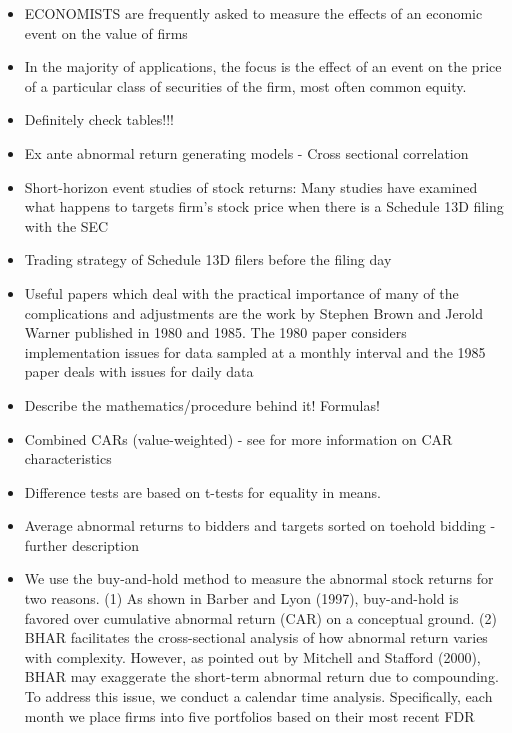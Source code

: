 \documentclass[12pt]{article}
\begin{document}
    \begin{itemize}
        
        \item ECONOMISTS are frequently asked to measure the effects of an economic event on the value of firms \citep{MacKinlay1997}

        \item In the majority of applications, the focus is the effect of an event on the price of a particular class of securities of the firm, most often common equity. \citep{MacKinlay1997}

        \item Definitely check \citet{Betton2009} tables!!!
        
        \item Ex ante abnormal return generating models \citep{Kolari2010} - Cross sectional correlation 

        \item Short-horizon event studies of stock returns: Many studies have examined what happens to targets firm’s stock price when there is a Schedule 13D filing with the SEC \citep{CoffeeJr.2014}

        \item Trading strategy of Schedule 13D filers before the filing day \citep{Collin-Dufresne2015}
        
        \item Useful papers which deal with the practical importance of many of the complications and adjustments are the work by Stephen Brown and Jerold Warner published in 1980 and 1985. The 1980 paper considers implementation issues for data sampled at a monthly interval and the 1985 paper deals with issues for daily data \citep{MacKinlay1997}
        
        \item Describe the mathematics/procedure behind it! Formulas! 

        \item Combined CARs (value-weighted) - see \citet{Mitchell2011} for more information on CAR characteristics

        \item Difference tests are based on t-tests for equality in means. \citep{Moeller2004}

        \item Average abnormal returns to bidders and targets sorted on toehold bidding - further description \citep{Betton2009}

        \item We use the buy-and-hold method to measure the abnormal stock returns for two reasons. (1) As shown in Barber and Lyon (1997), buy-and-hold is favored over cumulative abnormal return (CAR) on a conceptual ground. (2) BHAR facilitates the cross-sectional analysis of how abnormal return varies with complexity. However, as pointed out by Mitchell and Stafford (2000), BHAR may exaggerate the short-term abnormal return due to compounding. To address this issue, we conduct a calendar time analysis. Specifically, each month we place firms into five portfolios based on their most recent FDR \citep{You2009}
        

\end{itemize}
\end{document}
